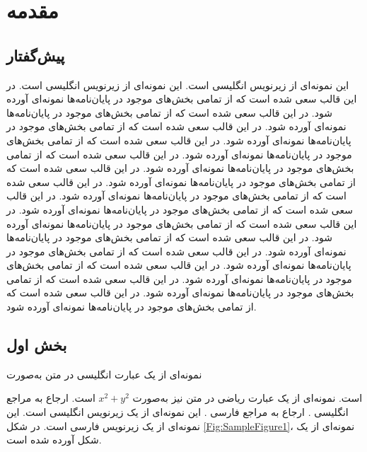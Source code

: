 
\chapter{مقدمه}
\section{پیش‌گفتار}
این نمونه‌ای از زیرنویس  انگلیسی است.	
این نمونه‌ای از زیرنویس  انگلیسی است.	
در این قالب سعی شده است که از تمامی بخش‌های موجود در پایان‌نامه‌ها نمونه‌ای آورده شود. در این قالب سعی شده است که از تمامی بخش‌های موجود در پایان‌نامه‌ها نمونه‌ای آورده شود. در این قالب سعی شده است که از تمامی بخش‌های موجود در پایان‌نامه‌ها نمونه‌ای آورده شود. در این قالب سعی شده است که از تمامی بخش‌های موجود در پایان‌نامه‌ها نمونه‌ای آورده شود. در این قالب سعی شده است که از تمامی بخش‌های موجود در پایان‌نامه‌ها نمونه‌ای آورده شود. در این قالب سعی شده است که از تمامی بخش‌های موجود در پایان‌نامه‌ها نمونه‌ای آورده شود. در این قالب سعی شده است که از تمامی بخش‌های موجود در پایان‌نامه‌ها نمونه‌ای آورده شود. در این قالب سعی شده است که از تمامی بخش‌های موجود در پایان‌نامه‌ها نمونه‌ای آورده شود. در این قالب سعی شده است که از تمامی بخش‌های موجود در پایان‌نامه‌ها نمونه‌ای آورده شود. در این قالب سعی شده است که از تمامی بخش‌های موجود در پایان‌نامه‌ها نمونه‌ای آورده شود. در این قالب سعی شده است که از تمامی بخش‌های موجود در پایان‌نامه‌ها نمونه‌ای آورده شود. در این قالب سعی شده است که از تمامی بخش‌های موجود در پایان‌نامه‌ها نمونه‌ای آورده شود. در این قالب سعی شده است که از تمامی بخش‌های موجود در پایان‌نامه‌ها نمونه‌ای آورده شود. در این قالب سعی شده است که از تمامی بخش‌های موجود در پایان‌نامه‌ها نمونه‌ای آورده شود.
\section{بخش اول}
نمونه‌ای از یک عبارت انگلیسی در متن به‌صورت

است. نمونه‌ای از یک عبارت ریاضی در متن نیز به‌صورت
$x^2 + y^2$
است. ارجاع به مراجع انگلیسی
\cite{Fakhari2015a,Lewis2003}.
ارجاع به مراجع فارسی
\cite{Fakhari2015b,HadianThesis2008}.
این نمونه‌ای از یک زیرنویس انگلیسی%
است. این نمونه‌ای از یک زیرنویس فارسی%
است. در شکل
\ref{Fig:SampleFigure1}،
نمونه‌ای از یک شکل آورده شده است. 


